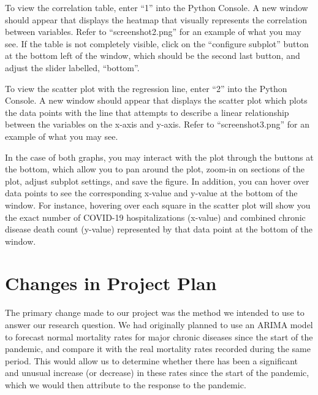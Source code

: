 \documentclass[fontsize=11pt]{article}
\begin{document}
\noindent
To view the correlation table, enter “1” into the Python Console. A new window should appear that displays the heatmap that visually represents the correlation between variables. Refer to “screenshot2.png” for an example of what you may see. If the table is not completely visible, click on the “configure subplot” button at the bottom left of the window, which should be the second last button, and adjust the slider labelled, “bottom”.

To view the scatter plot with the regression line, enter “2” into the Python Console. A new window should appear that displays the scatter plot which plots the data points with the line that attempts to describe a linear relationship between the variables on the x-axis and y-axis. Refer to “screenshot3.png” for an example of what you may see.

\noindent
In the case of both graphs, you may interact with the plot through the buttons at the bottom, which allow you to pan around the plot, zoom-in on sections of the plot, adjust subplot settings, and save the figure. In addition, you can hover over data points to see the corresponding x-value and y-value at the bottom of the window. For instance, hovering over each square in the scatter plot will show you the exact number of COVID-19 hospitalizations (x-value) and combined chronic disease death count (y-value) represented by that data point at the bottom of the window.  

\section*{Changes in Project Plan}
The primary change made to our project was the method we intended to use to answer our research question. We had originally planned to use an ARIMA model to forecast normal mortality rates for major chronic diseases since the start of the pandemic, and compare it with the real mortality rates recorded during the same period. This would allow us to determine whether there has been a significant and unusual increase (or decrease) in these rates since the start of the pandemic, which we would then attribute to the response to the pandemic.
\end{document}
